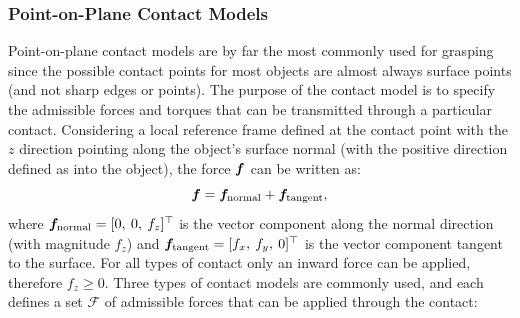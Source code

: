 \subsubsection{Point-on-Plane Contact Models}
Point-on-plane contact models are by far the most commonly used for grasping since the possible contact points for most objects are almost always surface points (and not sharp edges or points).
The purpose of the contact model is to specify the admissible forces and torques that can be transmitted through a particular contact. Considering a local reference frame defined at the contact point with the $z$ direction pointing along the object's surface normal (with the positive direction defined as into the object), the force $\bm{f}$ can be written as:
\begin{equation*}
        \bm{f} = \bm{f}_{\text{normal}} + \bm{f}_{\text{tangent}},
\end{equation*}
where $\bm{f}_{\text{normal}} = [0,\: 0,\: f_z ]^\top $ is the vector component along the normal direction (with magnitude $f_z$) and $\bm{f}_{\text{tangent}} =[f_x,\: f_y,\: 0 ]^\top $ is the vector component tangent to the surface. For all types of contact only an inward force can be applied, therefore $f_z \geq 0$. Three types of contact models are commonly used, and each defines a set $\mathcal{F}$ of admissible forces that can be applied through the contact:
